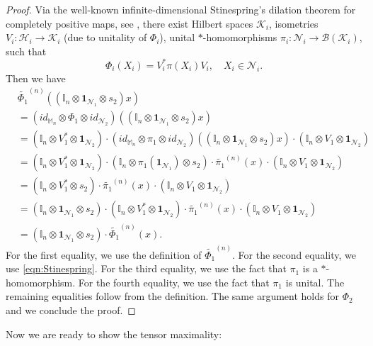 \documentclass[11pt,reqno]{amsart}
\numberwithin{equation}{section}
\newcommand{\mb}{\mathbb}
\newcommand{\wt}{\widetilde}
\newcommand{\mc}{\mathcal}
\begin{document}
\begin{proof}
    Via the well-known infinite-dimensional Stinespring’s dilation theorem for completely positive maps, see \cite[Theorem 4.1]{Paulsen2003}, there exist Hilbert spaces $\mc K_i$, isometries $V_i : \mc H_i \to \mc K_i$ (due to unitality of $\Phi_i$), unital $*$-homomorphisms $\pi_i: \mc N_i \to \mc B(\mc K_i)$, such that 
    \begin{equation}\label{eqn:Stinespring}
        \Phi_i(X_i) = V_i^*\pi(X_i) V_i,\quad X_i \in \mc N_i.
    \end{equation}
    Then we have 
    \begin{align*}
        & \wt{\Phi_1}^{(n)}\left((\mb I_n \otimes \textbf{1}_{\mc N_1} \otimes s_2)x \right) \\
        & = (id_{\mb M_n} \otimes \Phi_1 \otimes id_{\mc N_2}) \left( (\mb I_n \otimes \textbf{1}_{\mc N_1} \otimes s_2)x  \right)\\
        & = (\mb I_n \otimes V_1^* \otimes \textbf{1}_{\mc N_2})\cdot (id_{\mb M_n} \otimes \pi_1 \otimes id_{\mc N_2}) \left( (\mb I_n \otimes \textbf{1}_{\mc N_1} \otimes s_2)x  \right) \cdot (\mb I_n \otimes V_1 \otimes \textbf{1}_{\mc N_2}) \\
        & = (\mb I_n \otimes V_1^* \otimes \textbf{1}_{\mc N_2})\cdot (\mb I_n \otimes \pi_1(\textbf{1}_{\mc N_1}) \otimes s_2) \cdot \wt{\pi_1}^{(n)}(x)\cdot (\mb I_n \otimes V_1 \otimes \textbf{1}_{\mc N_2}) \\
        & = (\mb I_n \otimes V_1^* \otimes s_2)\cdot \wt{\pi_1}^{(n)}(x)\cdot (\mb I_n \otimes V_1 \otimes \textbf{1}_{\mc N_2}) \\
        & = (\mb I_n \otimes \textbf{1}_{\mc N_1} \otimes s_2)\cdot (\mb I_n \otimes V_1^* \otimes \textbf{1}_{\mc N_2})\cdot \wt{\pi_1}^{(n)}(x)\cdot (\mb I_n \otimes V_1 \otimes \textbf{1}_{\mc N_2}) \\
        & = (\mb I_n \otimes \textbf{1}_{\mc N_1} \otimes s_2)\cdot \wt{\Phi_1}^{(n)}(x).
    \end{align*}
    For the first equality, we use the definition of $\wt{\Phi_1}^{(n)}$. For the second equality, we use \eqref{eqn:Stinespring}. For the third equality, we use the fact that $\pi_1$ is a $*$-homomorphism. For the fourth equality, we use the fact that $\pi_1$ is unital. The remaining equalities follow from the definition. The same argument holds for $\Phi_2$ and we conclude the proof.
\end{proof}
Now we are ready to show the tensor maximality: 
\end{document}
